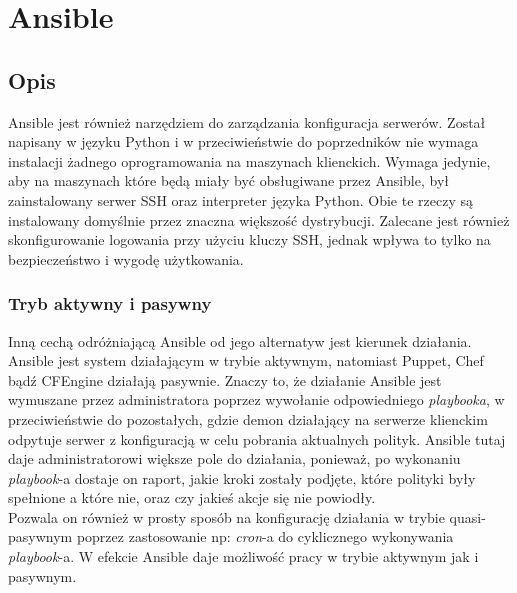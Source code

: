 \section{Ansible}
\subsection{Opis}
Ansible jest również narzędziem do zarządzania konfiguracja serwerów. Został napisany w języku Python i w przeciwieństwie do poprzedników nie wymaga instalacji żadnego oprogramowania na maszynach klienckich.
Wymaga jedynie, aby na maszynach które będą miały być obsługiwane przez Ansible, był zainstalowany serwer SSH oraz interpreter języka Python. Obie te rzeczy są instalowany domyślnie przez znaczna większość dystrybucji.
Zalecane jest również skonfigurowanie logowania przy użyciu kluczy SSH, jednak wpływa to tylko na bezpieczeństwo i wygodę użytkowania.\\
\subsubsection{Tryb aktywny i pasywny}
Inną cechą odróżniającą Ansible od jego alternatyw jest kierunek działania.
Ansible jest system działającym w trybie aktywnym, natomiast Puppet, Chef bądź CFEngine działają pasywnie.
Znaczy to, że działanie Ansible jest wymuszane przez administratora poprzez wywołanie odpowiedniego \textit{playbooka}, w przeciwieństwie do pozostałych, gdzie demon działający na serwerze klienckim odpytuje serwer z konfiguracją w celu pobrania aktualnych polityk.
Ansible tutaj daje administratorowi większe pole do działania, ponieważ, po wykonaniu \textit{playbook}-a dostaje on raport, jakie kroki zostały podjęte, które polityki były spełnione a które nie, oraz czy jakieś akcje się nie powiodły.\\
Pozwala on również w prosty sposób na konfigurację działania w trybie quasi-pasywnym poprzez zastosowanie np: \textit{cron}-a do cyklicznego wykonywania \textit{playbook}-a.
W efekcie Ansible daje możliwość pracy w trybie aktywnym jak i pasywnym.
